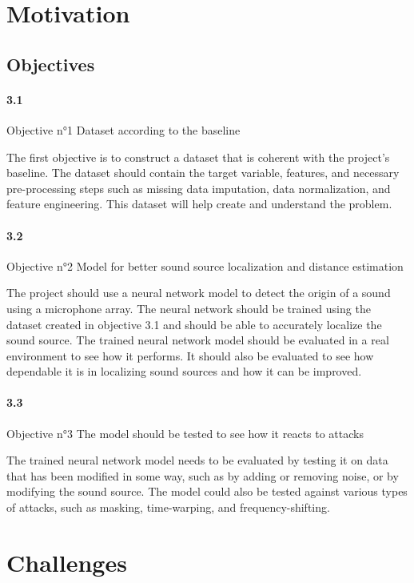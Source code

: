 \section{Motivation}
\label{intro:motivation}

\subsection{Objectives}

\paragraph{3.1} Objective n°1 Dataset according to the baseline

The first objective is to construct a dataset that is coherent with the project's baseline. The dataset should contain the target variable, features, and necessary pre-processing steps such as missing data imputation, data normalization, and feature engineering. This dataset will help create and understand the problem.

\paragraph{3.2} Objective n°2 Model for better sound source localization and distance estimation

The project should use a neural network model to detect the origin of a sound using a microphone array. The neural network should be trained using the dataset created in objective 3.1 and should be able to accurately localize the sound source. The trained neural network model should be evaluated in a real environment to see how it performs. It should also be evaluated to see how dependable it is in localizing sound sources and how it can be improved.

\paragraph{3.3} Objective n°3 The model should be tested to see how it reacts to attacks

The trained neural network model needs to be evaluated by testing it on data that has been modified in some way, such as by adding or removing noise, or by modifying the sound source. The model could also be tested against various types of attacks, such as masking, time-warping, and frequency-shifting.

\section{Challenges}
\label{intro:challenges}

